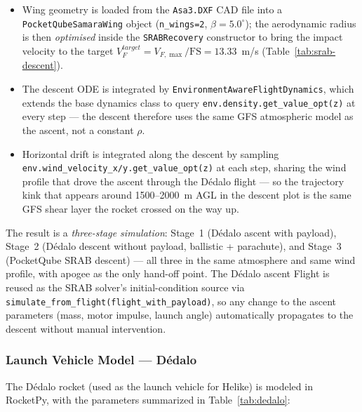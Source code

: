 \begin{itemize}
  \item Wing geometry is loaded from the \texttt{Asa3.DXF} CAD file
    into a \texttt{PocketQubeSamaraWing} object
    (\texttt{n\_wings=2}, $\beta = 5.0^{\circ}$); the aerodynamic
    radius is then \emph{optimised} inside the \texttt{SRABRecovery}
    constructor to bring the impact velocity to the target
    $V_F^{target} = V_{F,\max}/\mathrm{FS} = 13.33$~m/s (Table~\ref{tab:srab-descent}).
  \item The descent ODE is integrated by
    \texttt{EnvironmentAwareFlightDynamics}, which extends the
    base dynamics class to query \texttt{env.density.get\_value\_opt(z)}
    at every step --- the descent therefore uses the same GFS
    atmospheric model as the ascent, not a constant $\rho$.
  \item Horizontal drift is integrated along the descent by
    sampling \texttt{env.wind\_velocity\_x/y.get\_value\_opt(z)} at
    each step, sharing the wind profile that drove the ascent
    through the Dédalo flight --- so the trajectory kink that
    appears around 1500--2000~m AGL in the descent plot is the
    same GFS shear layer the rocket crossed on the way up.
\end{itemize}

The result is a \emph{three-stage simulation}: Stage~1 (Dédalo
ascent with payload), Stage~2 (Dédalo descent without payload,
ballistic + parachute), and Stage~3 (PocketQube SRAB descent) ---
all three in the same atmosphere and same wind profile, with
apogee as the only hand-off point. The Dédalo ascent Flight is
reused as the SRAB solver's initial-condition source via
\texttt{simulate\_from\_flight(flight\_with\_payload)}, so any
change to the ascent parameters (mass, motor impulse, launch
angle) automatically propagates to the descent without manual
intervention.

\subsubsection{Launch Vehicle Model — Dédalo}

The Dédalo rocket (used as the launch vehicle for Helike) is
modeled in RocketPy, with the parameters summarized in
Table~\ref{tab:dedalo}:

